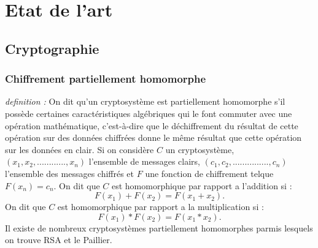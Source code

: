 \documentclass[a4paper,12pt]{article}
\begin{document}
\section{Etat de l'art} 
\subsection{Cryptographie}
\subsubsection{Chiffrement partiellement homomorphe}
\textit{definition : } On dit qu'un cryptosystème est partiellement homomorphe  s'il possède certaines caractéristiques algébriques qui le font commuter avec une opération mathématique, c'est-à-dire que le déchiffrement du résultat de cette opération sur des données chiffrées donne le même résultat que cette opération sur les données en clair. \newline
Si on considère $C$ un cryptosystème, $(x_1, x_2, ............, x_n)$ l'ensemble de messages clairs, $(c_1, c_2, ..............., c_n)$ l'ensemble des messages chiffrés et $ F$ une fonction de chiffrement telque $F(x_n) = c_n$. \newline
On dit que $C$ est homomorphique par rapport a l'addition si : \newline
 $$F(x_1) + F(x_2) = F(x_1 + x_2).$$
 On dit que $C$ est homomorphique par rapport a la multiplication si : \newline
 $$F(x_1) * F(x_2) = F(x_1 * x_2).$$
Il existe de nombreux cryptosystèmes partiellement homomorphes parmis lesquels on trouve RSA et le Paillier.%
\end{document}
